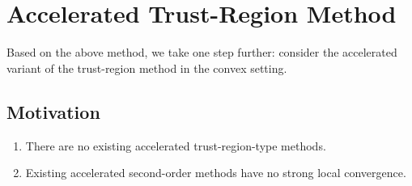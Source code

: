 \documentclass{mcom-l}
\numberwithin{equation}{section}
\begin{document}
\section{Accelerated Trust-Region Method}
Based on the above method, we take one step further: consider the accelerated variant of the trust-region method in the convex setting.
\subsection{Motivation}
\begin{enumerate}
    \item There are no existing accelerated trust-region-type methods.
    \item Existing accelerated second-order methods have no strong local convergence.
\end{enumerate}
\end{document}

